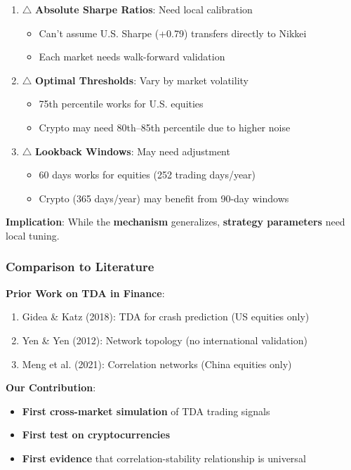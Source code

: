 \begin{enumerate}
\item $\triangle$ \textbf{Absolute Sharpe Ratios}: Need local calibration
   \begin{itemize}
   \item Can't assume U.S. Sharpe (+0.79) transfers directly to Nikkei
   \item Each market needs walk-forward validation
   \end{itemize}

\item $\triangle$ \textbf{Optimal Thresholds}: Vary by market volatility
   \begin{itemize}
   \item 75th percentile works for U.S. equities
   \item Crypto may need 80th--85th percentile due to higher noise
   \end{itemize}

\item $\triangle$ \textbf{Lookback Windows}: May need adjustment
   \begin{itemize}
   \item 60 days works for equities (252 trading days/year)
   \item Crypto (365 days/year) may benefit from 90-day windows
   \end{itemize}
\end{enumerate}

\textbf{Implication}: While the \textbf{mechanism} generalizes, \textbf{strategy parameters} need local tuning.

\subsubsection{Comparison to Literature}

\textbf{Prior Work on TDA in Finance}:
\begin{enumerate}
\item Gidea \& Katz (2018): TDA for crash prediction (US equities only)
\item Yen \& Yen (2012): Network topology (no international validation)
\item Meng et al. (2021): Correlation networks (China equities only)
\end{enumerate}

\textbf{Our Contribution}:
\begin{itemize}
\item \textbf{First cross-market simulation} of TDA trading signals
\item \textbf{First test on cryptocurrencies}
\item \textbf{First evidence} that correlation-stability relationship is universal
\end{itemize}


